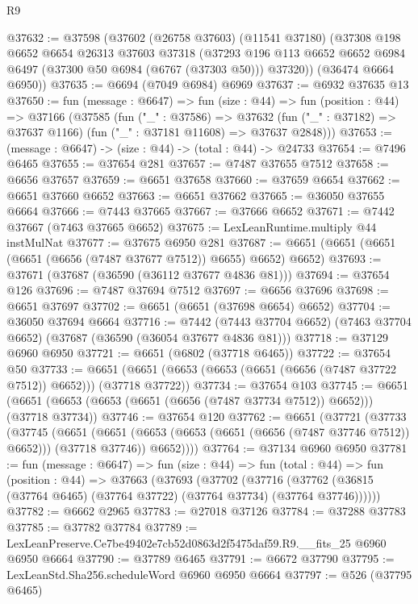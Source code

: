 \begin{lexlean}{R9}
\begin{coremodule}
@37632 := @37598
    (@37602
      (@26758 @37603)
      (@11541 @37180)
      (@37308
        @198
        @6652
        @6654
        @26313
        @37603
        @37318
        (@37293 @196 @113 @6652 @6652 @6984 @6497 (@37300 @50 @6984 (@6767 (@37303 @50))) @37320))
      (@36474 @6664 @6950))
@37635 := @6694 (@7049 @6984) @6969
@37637 := @6932 @37635 @13
@37650 := fun (message : @6647) =>
  fun (size : @44) =>
  fun (position : @44) =>
  @37166
    (@37585
      (fun ("_" : @37586) =>
      @37632 (fun ("_" : @37182) => @37637 @1166) (fun ("_" : @37181 @11608) => @37637 @2848)))
@37653 := (message : @6647) -> (size : @44) -> (total : @44) -> @24733
@37654 := @7496 @6465
@37655 := @37654 @281
@37657 := @7487 @37655 @7512
@37658 := @6656 @37657
@37659 := @6651 @37658
@37660 := @37659 @6654
@37662 := @6651 @37660 @6652
@37663 := @6651 @37662
@37665 := @36050 @37655 @6664
@37666 := @7443 @37665
@37667 := @37666 @6652
@37671 := @7442 @37667 (@7463 @37665 @6652)
@37675 := LexLeanRuntime.multiply @44 instMulNat
@37677 := @37675 @6950 @281
@37687 := @6651 (@6651 (@6651 (@6651 (@6656 (@7487 @37677 @7512)) @6655) @6652) @6652)
@37693 := @37671 (@37687 (@36590 (@36112 @37677 @4836 @81)))
@37694 := @37654 @126
@37696 := @7487 @37694 @7512
@37697 := @6656 @37696
@37698 := @6651 @37697
@37702 := @6651 (@6651 (@37698 @6654) @6652)
@37704 := @36050 @37694 @6664
@37716 := @7442
    (@7443 @37704 @6652)
    (@7463 @37704 @6652)
    (@37687 (@36590 (@36054 @37677 @4836 @81)))
@37718 := @37129 @6960 @6950
@37721 := @6651 (@6802 (@37718 @6465))
@37722 := @37654 @50
@37733 := @6651 (@6651 (@6653 (@6653 (@6651 (@6656 (@7487 @37722 @7512)) @6652))) (@37718 @37722))
@37734 := @37654 @103
@37745 := @6651 (@6651 (@6653 (@6653 (@6651 (@6656 (@7487 @37734 @7512)) @6652))) (@37718 @37734))
@37746 := @37654 @120
@37762 := @6651
    (@37721
      (@37733
        (@37745
          (@6651
            (@6651 (@6653 (@6653 (@6651 (@6656 (@7487 @37746 @7512)) @6652))) (@37718 @37746))
            @6652))))
@37764 := @37134 @6960 @6950
@37781 := fun (message : @6647) =>
  fun (size : @44) =>
  fun (total : @44) =>
  fun (position : @44) =>
  @37663
    (@37693
      (@37702
        (@37716 (@37762 (@36815 (@37764 @6465) (@37764 @37722) (@37764 @37734) (@37764 @37746))))))
@37782 := @6662 @2965
@37783 := @27018 @37126
@37784 := @37288 @37783
@37785 := @37782 @37784
@37789 := LexLeanPreserve.Ce7be49402e7cb52d0863d2f5475daf59.R9.__fits_25 @6960 @6950 @6664
@37790 := @37789 @6465
@37791 := @6672 @37790
@37795 := LexLeanStd.Sha256.scheduleWord @6960 @6950 @6664
@37797 := @526 (@37795 @6465)

\end{coremodule}
\end{lexlean}
